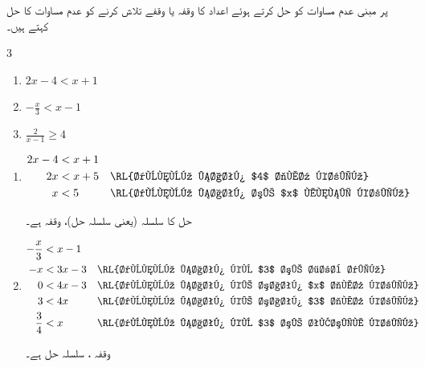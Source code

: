 


 پر مبنی عدم مساوات کو حل کرتے ہوئے اعداد کا وقفہ یا وقفے تلاش کرنے کو عدم مساوات کا حل کہتے ہیں۔

\begin{multicols}{3}
\begin{enumerate}[1)]
\item
 $2x-4<x+1$
\item
$-\tfrac{x}{3}<x-1$
\item
$\tfrac{2}{x-1}\ge 4$
\end{enumerate}
\end{multicols}
\begin{enumerate}[1)]
\item
\begin{align*}
2x-4&<x+1&&\\
2x&<x+5&&\text{\RL{دونوں ہاتھ $4$ جمع کریں}}\\
x&<5&& \text{\RL{دونوں ہاتھ سے $x$ منفی کریں}}
\end{align*}
%
\begin{center}
\end{center}
حل کا  سلسلہ  (یعنی سلسلہ حل)، وقفہ  ہے۔\\
\item
\begin{align*}
-\frac{x}{3}&<x-1\\
-x&<3x-3&&\text{\RL{دونوں ہاتھ کو $3$ سے ضرب دیں}}\\
0&<4x-3&&\text{\RL{دونوں ہاتھ کے ساتھ $x$ جمع کریں}}\\
3&<4x&&\text{\RL{دونوں ہاتھ کے ساتھ $3$ جمع کریں}}\\
\frac{3}{4}&<x&&\text{\RL{دونوں ہاتھ کو $3$ سے تقسیم کریں}}
\end{align*}
%
\begin{center}
\end{center}
وقفہ ،  سلسلہ حل   ہے۔\\

\end{enumerate}
